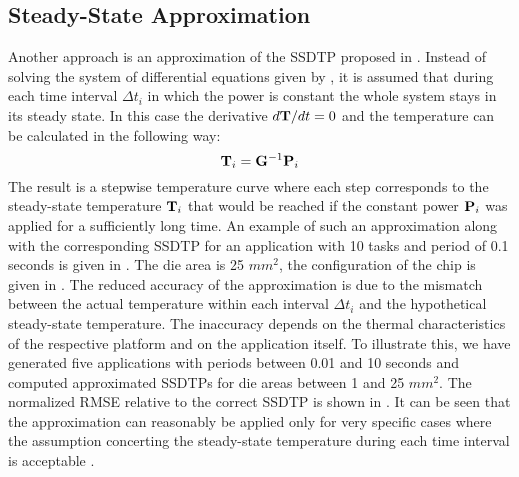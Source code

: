 \subsection{Steady-State Approximation} \label{sec:steady-state-approximation}
Another approach is an approximation of the SSDTP proposed in \cite{huang2009}. Instead of solving the system of differential equations given by , it is assumed that during each time interval $\Delta t_i$ in which the power is constant the whole system stays in its steady state. In this case the derivative \mbox{$d\mathbf{T}/dt = 0$} and the temperature can be calculated in the following way:
\[
  \mathbf{T}_i = \mathbf{G}^{-1} \mathbf{P}_i
\]
The result is a stepwise temperature curve where each step corresponds to the steady-state temperature $\mathbf{T}_i$ that would be reached if the constant power $\mathbf{P}_i$ was applied for a sufficiently long time. An example of such an approximation along with the corresponding SSDTP for an application with 10 tasks and period of 0.1 seconds is given in . The die area is 25 $mm^2$, the configuration of the chip is given in . The reduced accuracy of the approximation is due to the mismatch between the actual temperature within each interval $\Delta t_i$ and the hypothetical steady-state temperature. The inaccuracy depends on the thermal characteristics of the respective platform and on the application itself. To illustrate this, we have generated five applications with periods between 0.01 and 10 seconds and computed approximated SSDTPs for die areas between 1 and 25 $mm^2$. The normalized RMSE relative to the correct SSDTP is shown in . It can be seen that the approximation can reasonably be applied only for very specific cases where the assumption concerting the steady-state temperature during each time interval is acceptable \cite{huang2009}.
